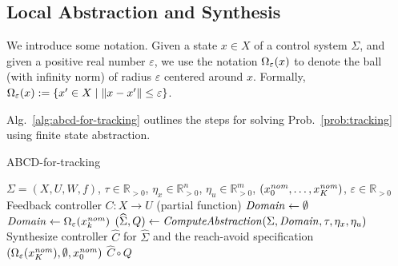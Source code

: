 \subsection{Local Abstraction and Synthesis}

We introduce some notation.
Given a state $x\in X$ of a control system $\Sigma$, and given a positive real number $\varepsilon$, we use the notation $\Omega_\varepsilon(x)$ to denote the ball (with infinity norm) of radius $\varepsilon$ centered around $x$.
Formally, $\Omega_\varepsilon(x):= \{ x'\in X\mid \| x-x' \|\leq \varepsilon \}$.

Alg.~\ref{alg:abcd-for-tracking} outlines the steps for solving Prob.~\ref{prob:tracking} using finite state abstraction.

\begin{algorithm}
	\caption{ABCD-for-tracking}
	\label{alg:abcd-for-tracking}
	\begin{algorithmic}[1]
		\Require $\Sigma=(X,U,W,f)$, $\tau \in \mathbb{R}_{>0}$, $\eta_x\in \mathbb{R}^n_{>0}$, $\eta_u\in \mathbb{R}^m_{>0}$, $(x_0^{\mathit{nom}},\ldots,x_K^{\mathit{nom}})$, $\varepsilon \in \mathbb{R}_{>0}$
		\Ensure Feedback controller $C:X\rightarrow U$ (partial function)
		\State $\mathit{Domain}\gets \emptyset$
			\State $\mathit{Domain}\gets \Omega_\varepsilon(x_k^{\mathit{nom}})$
		\EndFor
		\State $(\widehat{\Sigma},Q) \gets \mathit{ComputeAbstraction}(\Sigma, \mathit{Domain}, \tau, \eta_x, \eta_u)$
		\State Synthesize controller $\widehat{C}$ for $\widehat{\Sigma}$ and the reach-avoid specification $(\Omega_\varepsilon(x_K^{\mathit{nom}}), \emptyset, x_0^{\mathit{nom}})$
		\State \Return $\widehat{C}\circ Q$
	\end{algorithmic}
\end{algorithm}